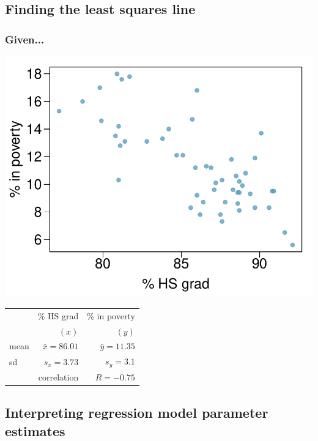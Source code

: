 
\subsection{Finding the least squares line}


\begin{frame}
\frametitle{Given...}

{
\begin{center}
\includegraphics[width=\textwidth]{8-2_least_square_reg/figures/poverty/poverty_hsgrad}
\end{center}
}
{
\begin{tabular}{l r r}
\hline
		& \% HS grad		& \% in poverty \\
		& $(x)$			& $(y)$ \\
\hline
mean	& $\bar{x} = 86.01$	& $\bar{y} = 11.35$  \\
sd		& $s_x = 3.73$		& $s_y = 3.1$ \\
\hline
		& correlation		& $R = -0.75$ \\
\hline
\end{tabular}
}

\end{frame}


\subsection{Interpreting regression model parameter estimates}

